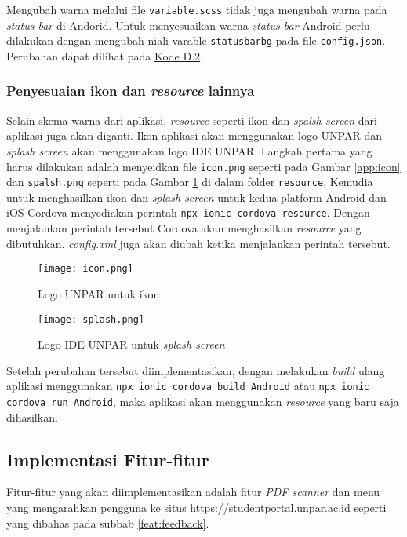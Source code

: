 Mengubah warna melalui file \texttt{variable.scss} tidak juga mengubah warna pada \textit{status bar} di Andorid. Untuk menyesuaikan warna \textit{status bar} Android perlu dilakukan dengan mengubah niali varable \texttt{statusbarbg} pada file \texttt{config.json}. Perubahan dapat dilihat pada \hyperref[status-bar-color]{Kode D.2}. 

\subsubsection{Penyesuaian ikon dan \textit{resource} lainnya}
Selain skema warna dari aplikasi, \textit{resource} seperti ikon dan \textit{spalsh screen} dari aplikasi juga akan diganti. Ikon aplikasi akan menggunakan logo UNPAR dan \textit{splash screen} akan menggunakan logo IDE UNPAR. Langkah pertama yang harus dilakukan adalah menyeidkan file \texttt{icon.png} seperti pada Gambar \ref{app:icon} dan \texttt{spalsh.png} seperti pada Gambar \ref{app:splash} di dalam folder \texttt{resource}. Kemudia untuk menghasilkan ikon dan \textit{splash screen} untuk kedua platform Android dan iOS Cordova menyediakan perintah \texttt{npx ionic cordova resource}. Dengan menjalankan perintah tersebut Cordova akan menghasilkan \textit{resource} yang dibutuhkan. \textit{config.xml} juga akan diubah ketika menjalankan perintah tersebut.

\begin{figure}[H] 
\begin{minipage}{.5\textwidth}
	\centering  
	\texttt{[image: icon.png]}  
	\caption[Logo  UNPAR] {Logo  UNPAR untuk ikon} 
	\label{app:icon}
\end{minipage}
\begin{minipage}{.5\textwidth}
	\centering 
	\texttt{[image: splash.png]}
	\caption[Logo IDE UNPAR untuk \textit{splash screen}] {Logo IDE UNPAR untuk \textit{splash screen}} 
	\label{app:splash} 
\end{minipage}
\end{figure} 




Setelah perubahan tersebut diimplementasikan, dengan melakukan \textit{build} ulang aplikasi menggunakan \texttt{npx ionic cordova build Android} atau \texttt{npx ionic cordova run Android}, maka aplikasi akan menggunakan \textit{resource} yang baru saja dihasilkan.

\subsection{Implementasi Fitur-fitur}
Fitur-fitur yang akan diimplementasikan adalah fitur \textit{PDF scanner} dan menu yang mengarahkan pengguna ke situs \url{https://studentportal.unpar.ac.id} seperti yang dibahas pada subbab \ref{feat:feedback}.%

